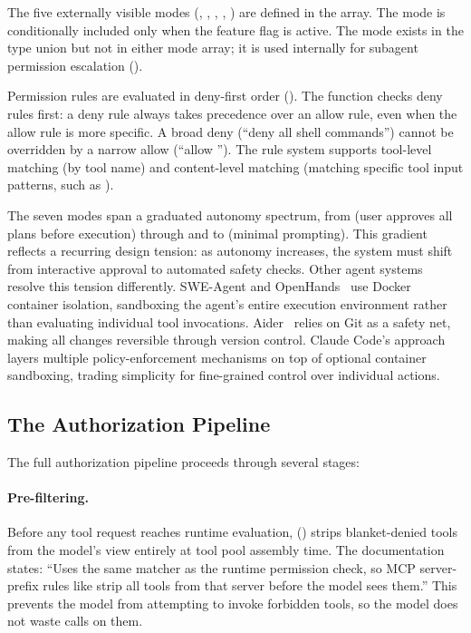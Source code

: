The five externally visible modes (, , , , ) are defined in the  array. The  mode is conditionally included only when the  feature flag is active. The  mode exists in the type union but not in either mode array; it is used internally for subagent permission escalation ().

Permission rules are evaluated in deny-first order (). The  function checks deny rules first: a deny rule always takes precedence over an allow rule, even when the allow rule is more specific. A broad deny (``deny all shell commands'') cannot be overridden by a narrow allow (``allow ''). The rule system supports tool-level matching (by tool name) and content-level matching (matching specific tool input patterns, such as ).

The seven modes span a graduated autonomy spectrum, from  (user approves all plans before execution) through  and  to  (minimal prompting). This gradient reflects a recurring design tension: as autonomy increases, the system must shift from interactive approval to automated safety checks. Other agent systems resolve this tension differently. SWE-Agent and OpenHands~\citep{yang2024sweagent,wang2024openhands} use Docker container isolation, sandboxing the agent's entire execution environment rather than evaluating individual tool invocations. Aider~\citep{gauthier2024aider} relies on Git as a safety net, making all changes reversible through version control. Claude Code's approach layers multiple policy-enforcement mechanisms on top of optional container sandboxing, trading simplicity for fine-grained control over individual actions.

\subsection{The Authorization Pipeline}
\label{sec:auth:pipeline}



The full authorization pipeline proceeds through several stages:

\paragraph{Pre-filtering.}
Before any tool request reaches runtime evaluation,  () strips blanket-denied tools from the model's view entirely at tool pool assembly time. The documentation states: ``Uses the same matcher as the runtime permission check, so MCP server-prefix rules like  strip all tools from that server before the model sees them.'' This prevents the model from attempting to invoke forbidden tools, so the model does not waste calls on them.

